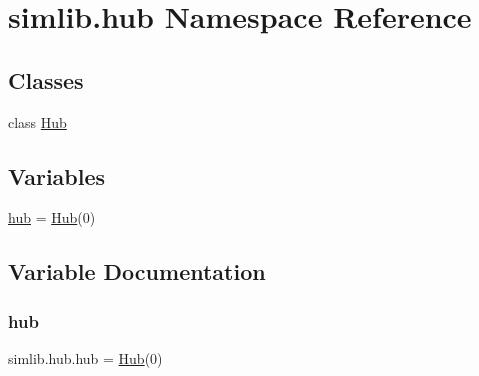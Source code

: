 \hypertarget{namespacesimlib_1_1hub}{}\section{simlib.\+hub Namespace Reference}
\label{namespacesimlib_1_1hub}
\subsection*{Classes}
\begin{DoxyCompactItemize}
\item 
class \mbox{\hyperlink{classsimlib_1_1hub_1_1_hub}{Hub}}
\end{DoxyCompactItemize}
\subsection*{Variables}
\begin{DoxyCompactItemize}
\item 
\mbox{\hyperlink{namespacesimlib_1_1hub_a5f38bbf5a55d8a5fd02d27f46d758565}{hub}} = \mbox{\hyperlink{classsimlib_1_1hub_1_1_hub}{Hub}}(0)
\end{DoxyCompactItemize}


\subsection{Variable Documentation}
\mbox{\label{namespacesimlib_1_1hub_a5f38bbf5a55d8a5fd02d27f46d758565}} 
\subsubsection{\texorpdfstring{hub}{hub}}
{\footnotesize\ttfamily simlib.\+hub.\+hub = \mbox{\hyperlink{classsimlib_1_1hub_1_1_hub}{Hub}}(0)}


